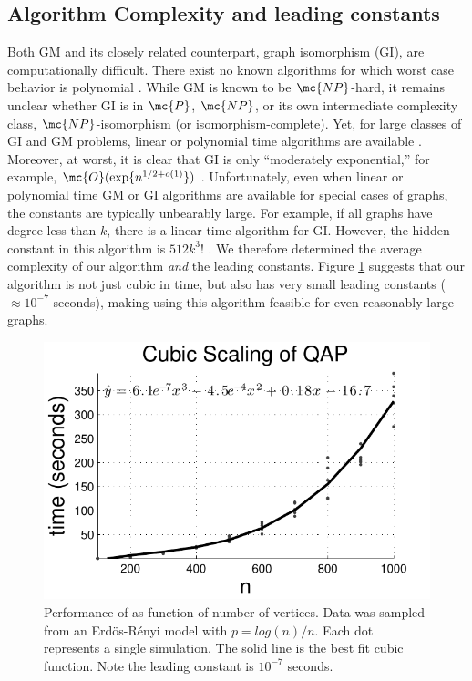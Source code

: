 \documentclass[10pt,journal,cspaper,compsoc]{IEEEtran}
\begin{document}


\subsection{Algorithm Complexity and leading constants} %
\label{sub:algorithm_complexity_and_leading_constants}

Both GM and its closely related counterpart, graph isomorphism (GI), are computationally difficult.  There exist no known algorithms for which worst case behavior is polynomial \cite{Fortin1996}.  While GM is known to be $\mc{NP}$-hard, it remains unclear whether GI is in $\mc{P}$, $\mc{NP}$, or its own intermediate complexity class, $\mc{NP}$-isomorphism (or isomorphism-complete).  Yet, for large classes of GI and GM problems, linear or polynomial time algorithms are available \cite{Babai1980}.  Moreover, at worst, it is clear that GI is only ``moderately exponential,'' for example, $\mc{O}(\exp\{n^{1/2 + o(1)}\})$ \cite{Babai1981}.  Unfortunately, even when linear or polynomial time GM or GI algorithms are available for special cases of graphs, the constants are typically unbearably large.  For example, if all graphs have degree less than $k$, there is a linear time algorithm for GI.  However, the hidden constant in this algorithm is $512k^3!$ \cite{Chen1994}.  We therefore determined the average complexity of our algorithm \emph{and} the leading constants.  Figure \ref{fig:scaling} suggests that our algorithm is not just cubic in time, but also has very small leading constants ($\approx 10^{-7}$ seconds), making using this algorithm feasible for even reasonably large graphs.




\begin{figure}[htbp]
	\centering			
	\includegraphics[width=1.0\linewidth]{../figs/digraph_qap2}
	\caption{Performance of \qap as function of number of vertices. Data was sampled from an Erd\"os-R\'enyi model with $p=log(n)/n$.  Each dot represents a single simulation.  The solid line is the best fit cubic function.  Note the leading constant is $10^{-7}$ seconds. }
	\label{fig:scaling}
\end{figure}
\end{document}
